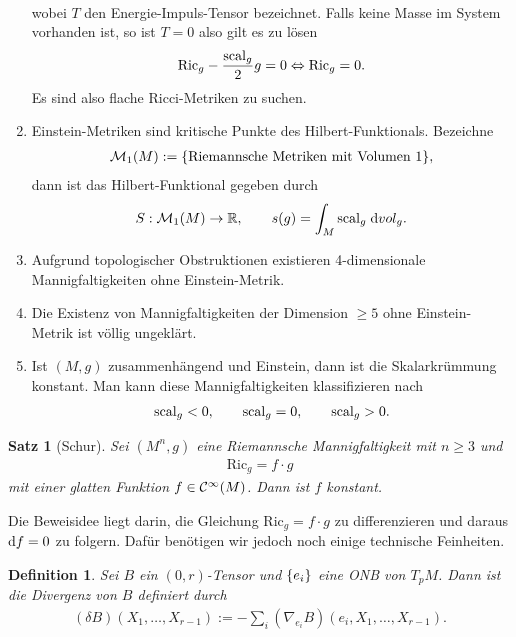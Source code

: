 \documentclass[12pt,a4paper]{article}
\def\R{\mathbb{R}}
\def\Ric{\mathrm{Ric}}
\newtheorem{Satz}[Lemma]{Satz}
\newtheorem{Definition}[Lemma]{Definition}
\begin{document}
\begin{enumerate}
\begin{align*}
\end{align*}
wobei $T$ den Energie-Impuls-Tensor bezeichnet. Falls keine Masse im System
vorhanden ist, so ist $T=0$ also gilt es zu l\"osen
\begin{align*}
\Ric_g -\frac{\scal_g}{2}g = 0\Leftrightarrow
\Ric_g = 0.
\end{align*}
Es sind also flache Ricci-Metriken zu suchen. 
\item Einstein-Metriken sind kritische Punkte des Hilbert-Funktionals. Bezeichne
\begin{align*}
\mathcal M_1 (M) := \{\text{Riemannsche Metriken mit Volumen }1\},
\end{align*}
dann ist das Hilbert-Funktional gegeben durch
\begin{align*}
S: \mathcal M_1(M)\to \R,\qquad s(g) = \int_M \scal_g\; \mathrm{d}vol_g.
\end{align*}
\item Aufgrund topologischer Obstruktionen existieren 4-dimensionale
Mannigfaltigkeiten ohne Einstein-Metrik.
\item Die Existenz von Mannigfaltigkeiten der Dimension $\ge 5$ ohne
Einstein-Metrik ist v\"ollig ungekl\"art.
\item Ist $(M,g)$ zusammenh\"angend und Einstein, dann ist die Skalarkr\"ummung
konstant. Man kann diese Mannigfaltigkeiten klassifizieren nach
\begin{align*}
\mathrm{scal}_g < 0,\qquad \mathrm{scal}_g = 0,\qquad \mathrm{scal}_g  > 0.
\end{align*}
\end{enumerate}

\bigskip

\begin{Satz}[Schur]
Sei $(M^n,g)$ eine Riemannsche Mannigfaltigkeit mit $n\ge 3$ und
\begin{align*}
\Ric_g = f\cdot g
\end{align*}
mit einer glatten Funktion $f\in \mathcal{C}^\infty(M)$. Dann ist $f$
konstant.
\end{Satz}

Die Beweisidee liegt darin, die Gleichung $\Ric_g = f\cdot g$ zu differenzieren
und daraus $\mathrm{d}f = 0$ zu folgern. Daf\"ur ben\"otigen wir jedoch noch einige
technische Feinheiten.

\begin{Definition}
Sei $B$ ein $(0,r)$-Tensor und $\{e_i\}$ eine ONB von $T_pM$. Dann ist die
\emph{Divergenz} von $B$ definiert durch
\begin{align*}
(\delta B)(X_1,\ldots,X_{r-1}) := -\sum_{i} (\nabla_{e_i}
B)(e_i,X_1,\ldots,X_{r-1}).
\end{align*}
\end{Definition}
\end{document}
